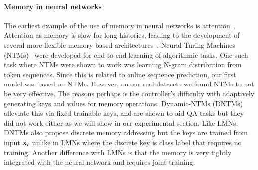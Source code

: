 \documentclass[letterpaper]{article} %
\newcommand{\vek}[1]{{\bf {#1}}}
\newcommand{\vx}{{\vek{x}}}
\begin{document}
\paragraph{Memory in neural networks}
The earliest example of the use of memory in neural networks is attention~.
Attention as memory is slow for long histories, leading to the development of several more flexible memory-based architectures~\cite{Weston16}.
Neural Turing Machines (NTMs)~\cite{GravesNTM} were developed for end-to-end learning of algorithmic tasks. One such task where NTMs were shown to work was learning N-gram distribution from token sequences. Since this is related to online sequence prediction, our first model was based on NTMs.  However, on our real datasets we found NTMs to not be very effective. The reasons perhaps is the controller's difficulty with adaptively generating keys and values for memory operations.  Dynamic-NTMs (DNTMs)~\cite{GulcehreCCB16} alleviate this via fixed trainable keys, and are shown to aid QA tasks but they did not work either as we will show in our experimental section.
Like LMNs, DNTMs also propose discrete memory addressing but the keys are trained from input $\vx_t$ unlike in LMNs where the discrete key is class label that requires no training.
Another difference with LMNs is that the memory is very tightly integrated with the neural network and requires joint training. 
\end{document}
